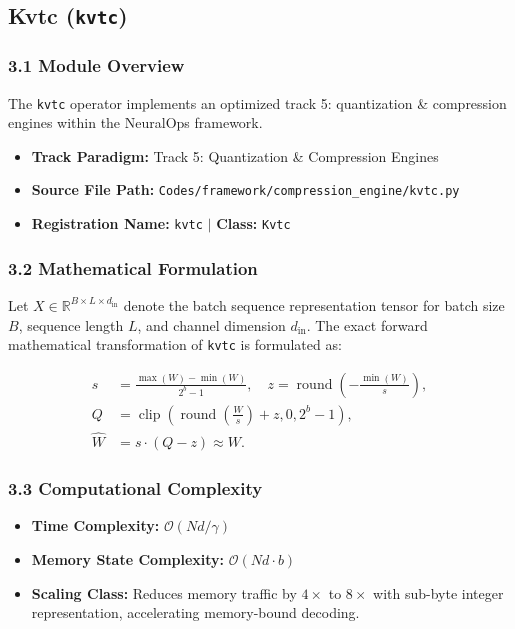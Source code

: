 \subsection{Kvtc (\texttt{kvtc})}
\label{sec:app_module_kvtc}

\subsubsection*{3.1 Module Overview}
The \texttt{kvtc} operator implements an optimized track 5: quantization \& compression engines within the NeuralOps framework.
\begin{itemize}
    \item \textbf{Track Paradigm:} Track 5: Quantization & Compression Engines
    \item \textbf{Source File Path:} \texttt{Codes/framework/compression\_engine/kvtc.py}
    \item \textbf{Registration Name:} \texttt{kvtc} $\mid$ \textbf{Class:} \texttt{Kvtc}
\end{itemize}

\subsubsection*{3.2 Mathematical Formulation}
Let $X \in \mathbb{R}^{B \times L \times d_{\text{in}}}$ denote the batch sequence representation tensor for batch size $B$, sequence length $L$, and channel dimension $d_{\text{in}}$. The exact forward mathematical transformation of \texttt{kvtc} is formulated as:

\begin{align}
s &= \frac{\max(W) - \min(W)}{2^b - 1}, \quad z = \operatorname{round}\left(-\frac{\min(W)}{s}\right), \\
Q &= \operatorname{clip}\left(\operatorname{round}\left(\frac{W}{s}\right) + z, 0, 2^b - 1\right), \\
\hat{W} &= s \cdot (Q - z) \approx W.
\end{align}


\subsubsection*{3.3 Computational Complexity}
\begin{itemize}
    \item \textbf{Time Complexity:} $\mathcal{O}(N d / \gamma)$
    \item \textbf{Memory State Complexity:} $\mathcal{O}(N d \cdot b)$
    \item \textbf{Scaling Class:} Reduces memory traffic by $4\times$ to $8\times$ with sub-byte integer representation, accelerating memory-bound decoding.
\end{itemize}

